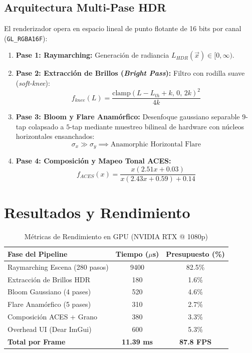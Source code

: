 \documentclass[10pt,twocolumn,a4paper]{article}
\begin{document}
\subsection{Arquitectura Multi-Pase HDR}
El renderizador opera en espacio lineal de punto flotante de 16 bits por canal (\texttt{GL\_RGBA16F}):
\begin{enumerate}
    \item \textbf{Pase 1: Raymarching:} Generación de radiancia $L_{HDR}(\vec{x}) \in [0, \infty)$.
    \item \textbf{Pase 2: Extracción de Brillos (\textit{Bright Pass}):} Filtro con rodilla suave (\textit{soft-knee}):
    \begin{equation}
    f_{knee}(L) = \frac{\text{clamp}(L - L_{th} + k,\, 0,\, 2k)^2}{4k}
    \end{equation}
    \item \textbf{Pase 3: Bloom y Flare Anamórfico:} Desenfoque gaussiano separable $9$-tap colapsado a $5$-tap mediante muestreo bilineal de hardware con núcleos horizontales ensanchados:
    \begin{equation}
    \sigma_x \gg \sigma_y \implies \text{Anamorphic Horizontal Flare}
    \end{equation}
    \item \textbf{Pase 4: Composición y Mapeo Tonal ACES:}
    \begin{equation}
    f_{ACES}(x) = \frac{x (2.51 x + 0.03)}{x (2.43 x + 0.59) + 0.14}
    \end{equation}
\end{enumerate}

\section{Resultados y Rendimiento}

\begin{table}[htbp]
\centering
\caption{Métricas de Rendimiento en GPU (NVIDIA RTX @ 1080p)}
\label{tab:perf}
\begin{tabular}{lcc}
\toprule
\textbf{Fase del Pipeline} & \textbf{Tiempo ($\mu$s)} & \textbf{Presupuesto (\%)} \\
\midrule
Raymarching Escena (280 pasos) & 9400 & 82.5\% \\
Extracción de Brillos HDR & 180 & 1.6\% \\
Bloom Gaussiano (4 pases) & 520 & 4.6\% \\
Flare Anamórfico (5 pases) & 310 & 2.7\% \\
Composición ACES + Grano & 380 & 3.3\% \\
Overhead UI (Dear ImGui) & 600 & 5.3\% \\
\midrule
\textbf{Total por Frame} & \textbf{11.39 ms} & \textbf{87.8 FPS} \\
\bottomrule
\end{tabular}
\end{table}
\end{document}
